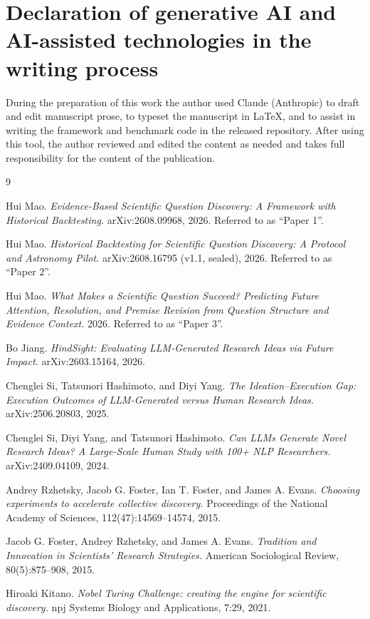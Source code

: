 \documentclass[11pt]{article}
\begin{document}
\section*{Declaration of generative AI and AI-assisted technologies in
the writing process}

During the preparation of this work the author used Claude (Anthropic)
to draft and edit manuscript prose, to typeset the manuscript in
\LaTeX{}, and to assist in writing the framework and benchmark code in
the released repository. After using this tool, the author reviewed and
edited the content as needed and takes full responsibility for the
content of the publication.

\begin{thebibliography}{9}

Hui Mao.
\emph{Evidence-Based Scientific Question Discovery: A Framework with
Historical Backtesting.}
arXiv:2608.09968, 2026. Referred to as ``Paper 1''.

Hui Mao.
\emph{Historical Backtesting for Scientific Question Discovery: A
Protocol and Astronomy Pilot.}
arXiv:2608.16795 (v1.1, sealed), 2026. Referred to as ``Paper 2''.

Hui Mao.
\emph{What Makes a Scientific Question Succeed? Predicting Future
Attention, Resolution, and Premise Revision from Question Structure and
Evidence Context.}
2026. Referred to as ``Paper 3''.

Bo Jiang.
\emph{HindSight: Evaluating LLM-Generated Research Ideas via Future
Impact.}
arXiv:2603.15164, 2026.

Chenglei Si, Tatsunori Hashimoto, and Diyi Yang.
\emph{The Ideation--Execution Gap: Execution Outcomes of LLM-Generated
versus Human Research Ideas.}
arXiv:2506.20803, 2025.

Chenglei Si, Diyi Yang, and Tatsunori Hashimoto.
\emph{Can LLMs Generate Novel Research Ideas? A Large-Scale Human Study
with 100+ NLP Researchers.}
arXiv:2409.04109, 2024.

Andrey Rzhetsky, Jacob G. Foster, Ian T. Foster, and James A. Evans.
\emph{Choosing experiments to accelerate collective discovery.}
Proceedings of the National Academy of Sciences, 112(47):14569--14574,
2015.

Jacob G. Foster, Andrey Rzhetsky, and James A. Evans.
\emph{Tradition and Innovation in Scientists' Research Strategies.}
American Sociological Review, 80(5):875--908, 2015.

Hiroaki Kitano.
\emph{Nobel Turing Challenge: creating the engine for scientific
discovery.}
npj Systems Biology and Applications, 7:29, 2021.

\end{thebibliography}
\end{document}
